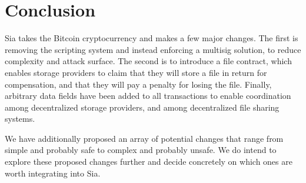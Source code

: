 \documentclass[twocolumn]{article}
\begin{document}


\section{Conclusion}
Sia takes the Bitcoin cryptocurrency and makes a few major changes.
The first is removing the scripting system and instead enforcing a multisig solution, to reduce complexity and attack surface.
The second is to introduce a file contract, which enables storage providers to claim that they will store a file in return for compensation, and that they will pay a penalty for losing the file.
Finally, arbitrary data fields have been added to all transactions to enable coordination among decentralized storage providers, and among decentralized file sharing systems.

We have additionally proposed an array of potential changes that range from simple and probably safe to complex and probably unsafe.
We do intend to explore these proposed changes further and decide concretely on which ones are worth integrating into Sia.
\end{document}
